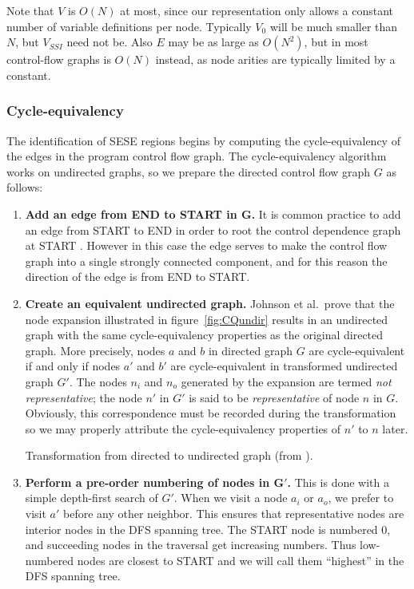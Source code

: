 \documentclass[12pt,titlepage]{article}
\begin{document}
Note that $V$ is $O(N)$ at most, since our representation only allows
a constant number of variable definitions per node.  Typically $V_0$
will be much smaller than $N$, but $V_{SSI}$ need not be.  Also $E$
may be as large as $O(N^2)$, but in most control-flow graphs is $O(N)$
instead, as node arities are typically limited by a constant.

\subsubsection{Cycle-equivalency}
\newcommand{\cyceq}{\equiv_{cq}}%
The identification of SESE regions begins by computing the
cycle-equivalency of the edges in the program control flow graph.  The
cycle-equivalency algorithm works on undirected graphs, so we prepare the
directed control flow graph $G$ as follows:
\begin{enumerate}
\item \textbf{Add an edge from END to START in $\mathbf{G}$.} It is common
practice to add an edge from START to END in order to root the control
dependence graph at START \cite{cytron89:ssa}.  However in this case
the edge serves to make the control flow graph into a single strongly
connected component, and for this reason the direction of the edge is
from END to START.
\item \textbf{Create an equivalent undirected graph.}  Johnson et al.\
prove that the node expansion illustrated in figure~\vref{fig:CQundir}
results in an undirected graph with the same cycle-equivalency
properties as the original directed graph.  More precisely, nodes $a$
and $b$ in directed graph $G$ are cycle-equivalent if and only if
nodes $a'$ and $b'$ are cycle-equivalent in transformed undirected
graph $G'$.  The nodes $n_i$ and $n_o$ generated by the expansion are
termed \emph{not representative}; the node $n'$ in $G'$ is said to be
\emph{representative} of node $n$ in $G$.  Obviously, this
correspondence must be recorded during the transformation so we may
properly attribute the cycle-equivalency properties of $n'$ to $n$
later.
\begin{myfigure}
\begin{center}

\end{center}
\caption{Transformation from directed to undirected graph
	 (from \cite{johnson93:sese}).}
\label{fig:CQundir}
\end{myfigure}
\item \textbf{Perform a pre-order numbering of nodes in $\mathbf{G'}$.}
This is done with a simple depth-first search of $G'$.  When we visit
a node $a_i$ or $a_o$, we prefer to visit $a'$ before any other
neighbor.  This ensures that representative nodes are interior nodes
in the DFS spanning tree. The START node is numbered 0, and succeeding
nodes in the traversal get increasing numbers.  Thus low-numbered
nodes are closest to START and we will call them ``highest'' in the
DFS spanning tree.
\end{enumerate}
\end{document}
